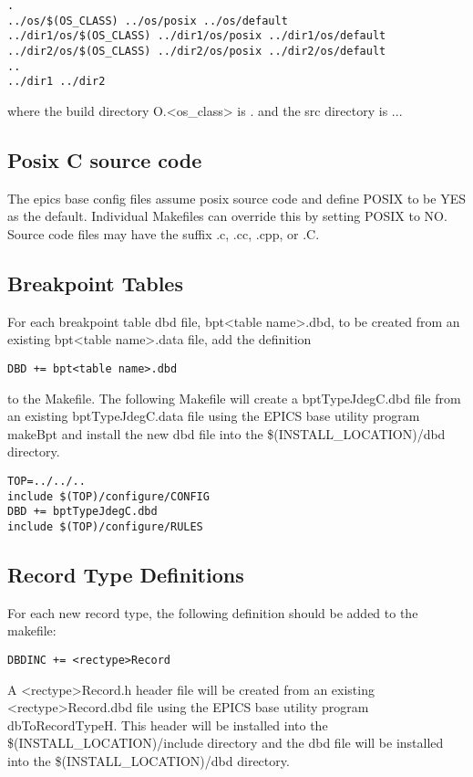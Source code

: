 \begin{verbatim}. 
../os/$(OS_CLASS) ../os/posix ../os/default
../dir1/os/$(OS_CLASS) ../dir1/os/posix ../dir1/os/default 
../dir2/os/$(OS_CLASS) ../dir2/os/posix ../dir2/os/default
..
../dir1 ../dir2
\end{verbatim}where the build directory O.\textless{}os\_class\textgreater{} is . and the src directory is ... 

\subsection{Posix C source code}

The epics base config files assume posix source code and define POSIX to be YES as the default. Individual Makefiles 
can override this by setting POSIX to NO. Source code files may have the suffix .c, .cc, .cpp, or .C.

\subsection{Breakpoint Tables}

For each breakpoint table dbd file, bpt\textless{}table name\textgreater{}.dbd, to be created from an existing bpt\textless{}table name\textgreater{}.data file, add the 
definition

\begin{verbatim}DBD += bpt<table name>.dbd
\end{verbatim}to the Makefile. The following Makefile will create a bptTypeJdegC.dbd file from an existing bptTypeJdegC.data file 
using the EPICS base utility program makeBpt and install the new dbd file into the \$(INSTALL\_LOCATION)/dbd 
directory.

\begin{verbatim}TOP=../../..
include $(TOP)/configure/CONFIG
DBD += bptTypeJdegC.dbd
include $(TOP)/configure/RULES
\end{verbatim}\subsection{Record Type Definitions}

For each new record type, the following definition should be added to the makefile:

\begin{verbatim}DBDINC += <rectype>Record
\end{verbatim}A \textless{}rectype\textgreater{}Record.h header file will be created from an existing \textless{}rectype\textgreater{}Record.dbd file using the EPICS base utility 
program dbToRecordTypeH. This header will be installed into the \$(INSTALL\_LOCATION)/include directory and the 
dbd file will be installed into the \$(INSTALL\_LOCATION)/dbd directory.

